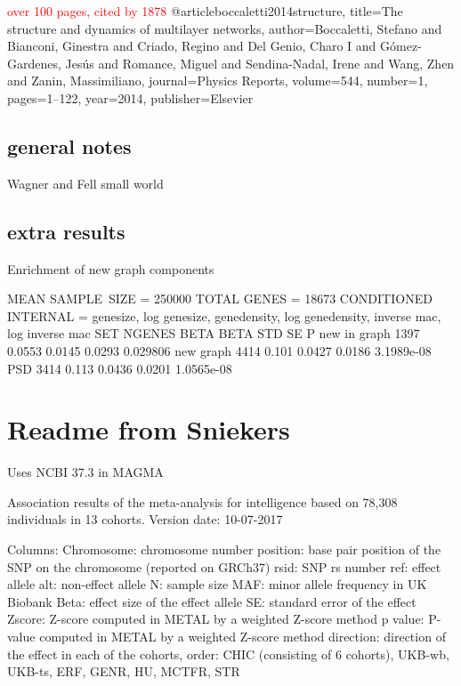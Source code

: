 \textcolor{red}{over 100 pages, cited by 1878}
@article{boccaletti2014structure,
  title={The structure and dynamics of multilayer networks},
  author={Boccaletti, Stefano and Bianconi, Ginestra and Criado, Regino and Del Genio, Charo I and G{\'o}mez-Gardenes, Jes{\'u}s and Romance, Miguel and Sendina-Nadal, Irene and Wang, Zhen and Zanin, Massimiliano},
  journal={Physics Reports},
  volume={544},
  number={1},
  pages={1--122},
  year={2014},
  publisher={Elsevier}
}



\subsection{general notes}
Wagner and Fell small world

\subsection{extra results}
Enrichment of new graph components


 MEAN SAMPLE\ SIZE = 250000
 TOTAL GENES = 18673
 CONDITIONED INTERNAL = genesize, log genesize, genedensity, log genedensity, inverse mac, log inverse mac
SET           NGENES       BETA   BETA STD         SE            P
new in graph    1397     0.0553     0.0145     0.0293     0.029806
new graph       4414      0.101     0.0427     0.0186   3.1989e-08
PSD             3414      0.113     0.0436     0.0201   1.0565e-08



\section{Readme from Sniekers}
\label{sec:notes readme from sniekers}

Uses NCBI 37.3 in MAGMA

     Association results of the meta-analysis for intelligence based on 78,308 individuals in 13 cohorts. 
     Version date: 10-07-2017

  Columns:
Chromosome: chromosome number
position: base pair position of the SNP on the chromosome (reported on GRCh37)
rsid: SNP rs number
ref: effect allele
alt: non-effect allele
N: sample size
MAF: minor allele frequency in UK Biobank
Beta: effect size of the effect allele
SE: standard error of the effect
Zscore: Z-score computed in METAL by a weighted Z-score method
p   value: P-value computed in METAL by a weighted Z-score method
direction: direction of the effect in each of the cohorts, order: CHIC (consisting of 6 cohorts), UKB-wb, UKB-ts, ERF, GENR, HU, MCTFR, STR

